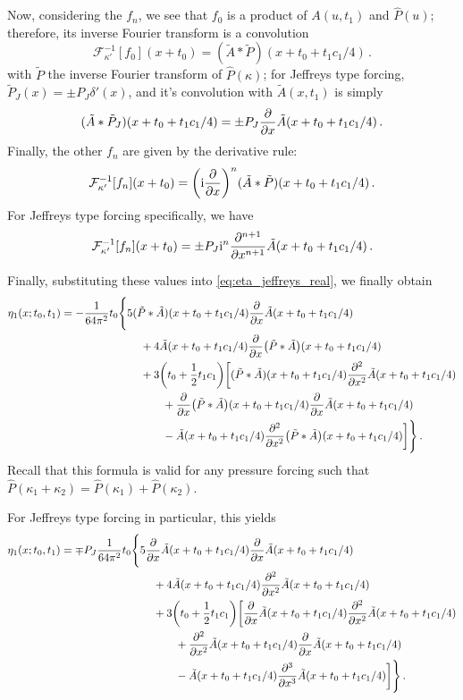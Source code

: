 \documentclass{jfm}
\newcommand{\GenPk}{\hat{P}(\kappa)}
\newcommand{\im}{\mathrm{i}}
\begin{document}
Now, considering the $f_n$, we see that $f_0$ is a product of $A(u,t_1)$
and $\hat{P}(u)$; therefore, its inverse Fourier transform is a
convolution
\[
  \mathcal{F}^{-1}_{\kappa'}[f_0](x+t_0) = (\tilde{A} * \tilde{P})(x+t_0+t_1 c_1/4)
  \,.
\]
with $\tilde{P}$ the inverse Fourier transform of $\GenPk$; for Jeffreys
type forcing, $\tilde{P}_J(x) = \pm P_J \delta'(x)$, and it's
convolution with $\tilde{A}(x,t_1)$ is simply
\[
  (\tilde{A} * \tilde{P}_J)(x+t_0+t_1 c_1/4) = \pm P_J \pdv{x}
  \tilde{A}(x+t_0+t_1 c_1/4) \,.
\]
Finally, the other $f_n$ are given by the derivative rule:
\[
  \mathcal{F}^{-1}_{\kappa'}[f_n](x+t_0) = \pqty{\im \pdv{x}}^n
  (\tilde{A} * \tilde{P})(x+t_0+t_1 c_1/4)
  \,.
\]
For Jeffreys type forcing specifically, we have
\[
  \mathcal{F}^{-1}_{\kappa'}[f_n](x+t_0) = \pm P_J \im^n \pdv[n+1]{x} \tilde{A}(x+t_0+t_1 c_1/4)
  \,.
\]

Finally, substituting these values into \cref{eq:eta_jeffreys_real}, we
finally obtain
\begin{align*}
  \eta_1(x;t_0,t_1) =
  -\frac{1}{64 \pi^2} t_0 &\Biggl\{
    5 (\tilde{P}*\tilde{A})(x+t_0+t_1 c_1/4) \pdv{x}\tilde{A}(x+t_0+t_1
    c_1/4) \\
    &\qquad
    + 4 \tilde{A}(x+t_0+t_1 c_1/4) \pdv{x} (\tilde{P}*\tilde{A})(x+t_0+t_1 c_1/4) \\
    &\qquad
    + 3 \pqty{t_0+\frac{1}{2} t_1 c_1} \biggl[
    (\tilde{P}*\tilde{A})(x+t_0+t_1 c_1/4) \pdv[2]{x} \tilde{A}(x+t_0+t_1 c_1/4) \\
    &\qquad\qquad
    + \pdv{x} (\tilde{P}*\tilde{A})(x+t_0+t_1 c_1/4) \pdv{x} \tilde{A}(x+t_0+t_1 c_1/4) \\
    &\qquad\qquad
    - \tilde{A}(x+t_0+t_1 c_1/4) \pdv[2]{x} (\tilde{P}*\tilde{A})(x+t_0+t_1 c_1/4)
  \biggr]
  \Biggr\} \,.
\end{align*}
Recall that this formula is valid for any pressure forcing such that
$\hat{P}(\kappa_1+\kappa_2) = \hat{P}(\kappa_1) + \hat{P}(\kappa_2)$.

For Jeffreys type forcing in particular, this yields
\begin{align*}
  \eta_1(x;t_0,t_1) =
  \mp P_J \frac{1}{64 \pi^2} t_0 &\Biggl\{
    5 \pdv{x} \tilde{A}(x+t_0+t_1 c_1/4) \pdv{x}\tilde{A}(x+t_0+t_1 c_1/4) \\
    &\qquad
    + 4 \tilde{A}(x+t_0+t_1 c_1/4) \pdv[2]{x} \tilde{A}(x+t_0+t_1 c_1/4) \\
    &\qquad
    + 3 \pqty{t_0+\frac{1}{2} t_1 c_1} \biggl[
    \pdv{x} \tilde{A}(x+t_0+t_1 c_1/4) \pdv[2]{x} \tilde{A}(x+t_0+t_1 c_1/4) \\
    &\qquad\qquad
    + \pdv[2]{x} \tilde{A}(x+t_0+t_1 c_1/4) \pdv{x} \tilde{A}(x+t_0+t_1 c_1/4) \\
    &\qquad\qquad
    - \tilde{A}(x+t_0+t_1 c_1/4) \pdv[3]{x} \tilde{A}(x+t_0+t_1 c_1/4)
  \biggr]
  \Biggr\} \,.
\end{align*}
\end{document}
